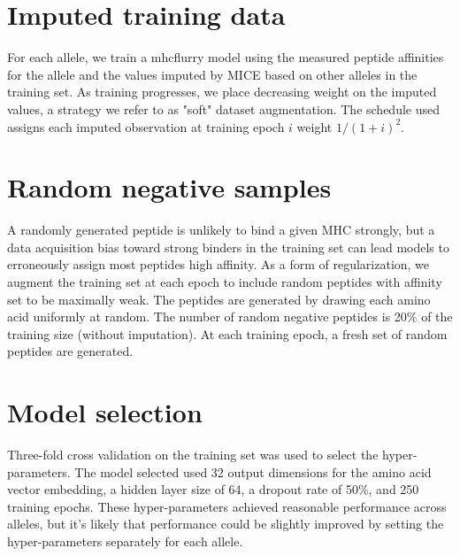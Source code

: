 \section{Imputed training data}
For each allele, we train a mhcflurry model using the measured peptide affinities for the allele and the values imputed by MICE based on other alleles in the training set. As training progresses, we place decreasing weight on the imputed values, a strategy we refer to as "soft" dataset augmentation. The schedule used assigns each imputed observation at training epoch $i$ weight $1 / (1 + i)^2$.

\section{Random negative samples}
A randomly generated peptide is unlikely to bind a given MHC strongly, but a data acquisition bias toward strong binders in the training set can lead models to erroneously assign most peptides high affinity. As a form of regularization, we augment the training set at each epoch to include random peptides with affinity set to be maximally weak. The peptides are generated by drawing each amino acid uniformly at random. The number of random negative peptides is 20\% of the training size (without imputation). At each training epoch, a fresh set of random peptides are generated.

\section{Model selection}
Three-fold cross validation on the training set was used to select the hyper-parameters. The model selected used 32 output dimensions for the amino acid vector embedding, a hidden layer size of 64, a dropout rate\cite{Srivastava2014} of 50\%, and 250 training epochs. These hyper-parameters achieved reasonable performance across alleles, but it's likely that performance could be slightly improved by setting the hyper-parameters separately for each allele.